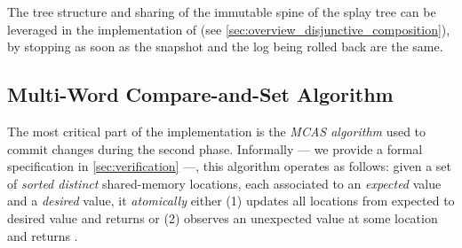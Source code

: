 The tree structure and sharing of the immutable spine of the splay tree can be leveraged in the implementation of  (see \cref{sec:overview_disjunctive_composition}), by stopping as soon as the snapshot and the log being rolled back are the same.

\subsection{Multi-Word Compare-and-Set Algorithm}
\label{sec:implementation_mcas}





The most critical part of the \Kcas implementation is the \emph{MCAS algorithm} used to commit changes during the second phase.
Informally --- we provide a formal specification in \cref{sec:verification} ---, this algorithm operates as follows: given a set of \emph{sorted distinct} shared-memory locations, each associated to an \emph{expected} value and a \emph{desired} value, it \emph{atomically} either (1) updates all locations from expected to desired value and returns  or (2) observes an unexpected value at some location and returns .

